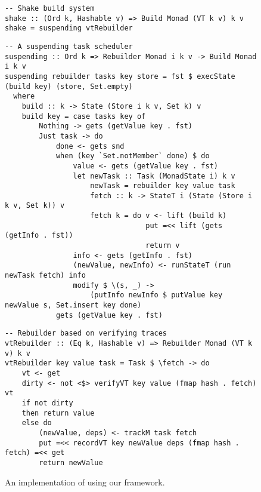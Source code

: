 \begin{figure}
\begin{verbatim}
-- Shake build system
shake :: (Ord k, Hashable v) => Build Monad (VT k v) k v
shake = suspending vtRebuilder
\end{verbatim}
\vspace{1mm}
\begin{verbatim}
-- A suspending task scheduler
suspending :: Ord k => Rebuilder Monad i k v -> Build Monad i k v
suspending rebuilder tasks key store = fst $ execState (build key) (store, Set.empty)
  where
    build :: k -> State (Store i k v, Set k) v
    build key = case tasks key of
        Nothing -> gets (getValue key . fst)
        Just task -> do
            done <- gets snd
            when (key `Set.notMember` done) $ do
                value <- gets (getValue key . fst)
                let newTask :: Task (MonadState i) k v
                    newTask = rebuilder key value task
                    fetch :: k -> StateT i (State (Store i k v, Set k)) v
                    fetch k = do v <- lift (build k)
                                 put =<< lift (gets (getInfo . fst))
                                 return v
                info <- gets (getInfo . fst)
                (newValue, newInfo) <- runStateT (run newTask fetch) info
                modify $ \(s, _) ->
                    (putInfo newInfo $ putValue key newValue s, Set.insert key done)
            gets (getValue key . fst)
\end{verbatim}
\vspace{1mm}
\begin{verbatim}
-- Rebuilder based on verifying traces
vtRebuilder :: (Eq k, Hashable v) => Rebuilder Monad (VT k v) k v
vtRebuilder key value task = Task $ \fetch -> do
    vt <- get
    dirty <- not <$> verifyVT key value (fmap hash . fetch) vt
    if not dirty
    then return value
    else do
        (newValue, deps) <- trackM task fetch
        put =<< recordVT key newValue deps (fmap hash . fetch) =<< get
        return newValue
\end{verbatim}
\vspace{-3mm}
\caption{An implementation of \Shake using our framework.}\label{fig-shake-implementation}
\vspace{1mm}
\end{figure}

\vspace{-2mm}
\subsection{\Bazel}\label{sec-implementation-bazel}
\vspace{-1mm}

